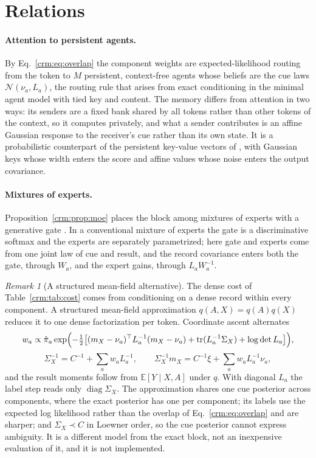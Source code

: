 \documentclass[11pt]{article}
\theoremstyle{definition}
\theoremstyle{remark}
\newtheorem{remark}[theorem]{Remark}
\providecommand{\tr}{\operatorname{tr}}
\newcommand{\E}{\mathbb E}
\newcommand{\Gauss}{\mathcal N}
\newcommand{\diag}{\operatorname{diag}}
\newcommand{\pihat}{\hat\pi}
\begin{document}
\section{Relations}
\label{crm:sec:relations}

\paragraph{Attention to persistent agents.} By Eq.~\eqref{crm:eq:overlap} the component weights are expected-likelihood routing from the token to $M$ persistent, context-free agents whose beliefs are the cue laws $\Gauss(\nu_a,L_a)$, the routing rule that arises from exact conditioning in the minimal agent model with tied key and content. The memory differs from attention in two ways: its senders are a fixed bank shared by all tokens rather than other tokens of the context, so it computes privately, and what a sender contributes is an affine Gaussian response to the receiver's cue rather than its own state. It is a probabilistic counterpart of the persistent key-value vectors of \citet{Sukhbaatar2019Persistent}, with Gaussian keys whose width enters the score and affine values whose noise enters the output covariance.

\paragraph{Mixtures of experts.} Proposition~\ref{crm:prop:moe} places the block among mixtures of experts with a generative gate \citep{Xu1995AlternativeMoE}. In a conventional mixture of experts the gate is a discriminative softmax and the experts are separately parametrized; here gate and experts come from one joint law of cue and result, and the record covariance enters both the gate, through $W_a$, and the expert gains, through $L_aW_a^{-1}$.

\begin{remark}[A structured mean-field alternative]
\label{crm:rem:meanfield}
The dense cost of Table~\ref{crm:tab:cost} comes from conditioning on a dense record within every component. A structured mean-field approximation $q(A,X)=q(A)q(X)$ reduces it to one dense factorization per token. Coordinate ascent alternates
\[
w_a\propto\pihat_a\exp\Bigl(-\tfrac12\bigl[(m_X-\nu_a)^\top L_a^{-1}(m_X-\nu_a)+\tr(L_a^{-1}\Sigma_X)+\log\det L_a\bigr]\Bigr),
\]
\[
\Sigma_X^{-1}=C^{-1}+\sum_aw_aL_a^{-1},\qquad \Sigma_X^{-1}m_X=C^{-1}\xi+\sum_aw_aL_a^{-1}\nu_a,
\]
and the result moments follow from $\E[Y\mid X,A]$ under $q$. With diagonal $L_a$ the label step reads only $\diag\Sigma_X$. The approximation shares one cue posterior across components, where the exact posterior has one per component; its labels use the expected log likelihood rather than the overlap of Eq.~\eqref{crm:eq:overlap} and are sharper; and $\Sigma_X\prec C$ in Loewner order, so the cue posterior cannot express ambiguity. It is a different model from the exact block, not an inexpensive evaluation of it, and it is not implemented.
\end{remark}
\end{document}
